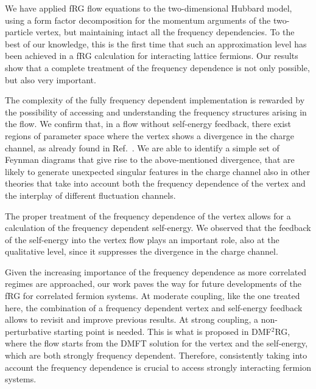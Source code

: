 We have applied fRG flow equations to the two-dimensional Hubbard model, using a form factor decomposition for the momentum arguments of the two-particle vertex, but maintaining intact all the frequency dependencies. 
To the best of our knowledge, this is the first time that such an approximation level has been achieved in a fRG calculation for interacting lattice fermions.
Our results show that a complete treatment of the frequency dependence is not only possible, but also very important.

The complexity of the fully frequency dependent implementation is rewarded by the possibility of accessing and understanding the frequency structures arising in the flow.
We confirm that, in a flow without self-energy feedback, there exist regions of parameter space where the vertex shows a divergence in the charge channel, as already found in Ref.~.
We are able to identify a simple set of Feynman diagrams that give rise to the above-mentioned divergence, that are likely to generate unexpected singular features in the charge channel also in other theories that take into account both the frequency dependence of the vertex and the interplay of different fluctuation channels.\cite{Stepanov2016}
 
The proper treatment of the frequency dependence of the vertex allows for a calculation of the frequency dependent self-energy.
We observed that the feedback of the self-energy into the vertex flow plays an important role, also at the qualitative level, since it suppresses the divergence in the charge channel. 

Given the increasing importance of the frequency dependence as more correlated regimes are approached, our work paves the way for future developments of the fRG for correlated fermion systems.
At moderate coupling, like the one treated here, the combination of a frequency dependent vertex and self-energy feedback allows to revisit and improve previous results. At strong coupling, a non-perturbative starting point is needed. 
This is what is proposed in DMF$^2$RG,\cite{Taranto2014} where the flow starts from the DMFT solution for the vertex and the self-energy, which are both strongly frequency dependent. Therefore, consistently taking into account the frequency dependence is crucial to access strongly interacting fermion systems.
